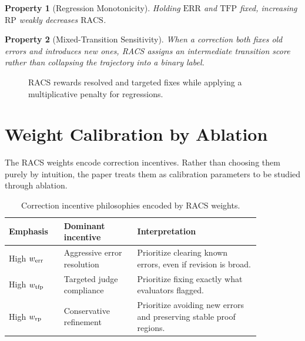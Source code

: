 \documentclass[conference]{IEEEtran}
\newtheorem{property}{Property}
\newcommand{\RACS}{\mathrm{RACS}}
\newcommand{\ERR}{\mathrm{ERR}}
\newcommand{\TFP}{\mathrm{TFP}}
\newcommand{\RP}{\mathrm{RP}}
\begin{document}
\begin{property}[Regression Monotonicity]
Holding $\ERR$ and $\TFP$ fixed, increasing $\RP$ weakly decreases $\RACS$.
\end{property}

\begin{property}[Mixed-Transition Sensitivity]
When a correction both fixes old errors and introduces new ones, RACS assigns an intermediate transition score rather than collapsing the trajectory into a binary label.
\end{property}

\begin{figure}[t]
\centering
{}
\caption{RACS rewards resolved and targeted fixes while applying a multiplicative penalty for regressions.}
\label{fig:racs}
\end{figure}

\section{Weight Calibration by Ablation}
\label{sec:ablation}

The RACS weights encode correction incentives. Rather than choosing them purely by intuition, the paper treats them as calibration parameters to be studied through ablation.

\begin{table}[t]
\caption{Correction incentive philosophies encoded by RACS weights.}
\centering
\footnotesize
\begin{tabular}{p{0.18\linewidth}p{0.25\linewidth}p{0.42\linewidth}}
\toprule
\textbf{Emphasis} & \textbf{Dominant incentive} & \textbf{Interpretation} \\
\midrule
High $w_{\rm err}$ & Aggressive error resolution & Prioritize clearing known errors, even if revision is broad. \\
High $w_{\rm tfp}$ & Targeted judge compliance & Prioritize fixing exactly what evaluators flagged. \\
High $w_{\rm rp}$ & Conservative refinement & Prioritize avoiding new errors and preserving stable proof regions. \\
\bottomrule
\end{tabular}
\label{tab:incentives}
\end{table}
\end{document}
